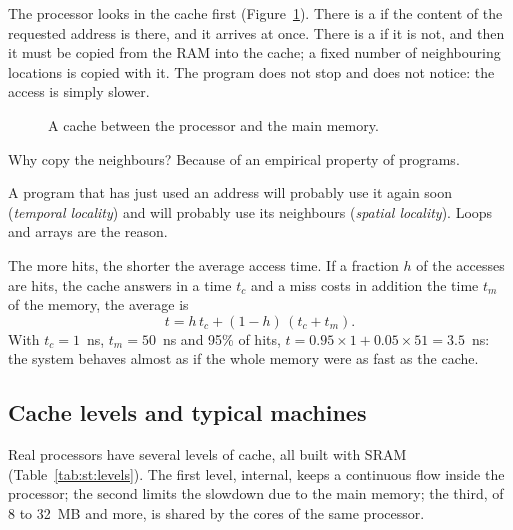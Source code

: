 The processor looks in the cache first (Figure~\ref{fig:st:cache}). There is
a  if the content of the requested address is there, and it arrives
at once. There is a  if it is not, and then it must be copied from
the RAM into the cache; a fixed number of neighbouring locations is copied
with it. The program does not stop and does not notice: the access is simply
slower.

\begin{figure}[htb]
\centering
{}
\caption{A cache between the processor and the main memory.}
\label{fig:st:cache}
\end{figure}

Why copy the neighbours? Because of an empirical property of programs.

\begin{prgconcept}
A program that has just used an address will probably use it again soon
(\emph{temporal locality}) and will probably use its neighbours
(\emph{spatial locality}). Loops and arrays are the reason.
\end{prgconcept}

The more hits, the shorter the average access time. If a fraction $h$ of the
accesses are hits, the cache answers in a time $t_c$ and a miss costs in
addition the time $t_m$ of the memory, the average is
\[ t = h\,t_c+(1-h)\,(t_c+t_m). \]
With $t_c=1$~ns, $t_m=50$~ns and 95\% of hits,
$t=0.95\times 1+0.05\times 51=3.5$~ns: the system behaves almost as if the
whole memory were as fast as the cache.

\subsection{Cache levels and typical machines}

Real processors have several levels of cache, all built with SRAM
(Table~\ref{tab:st:levels}). The first level, internal, keeps a continuous
flow inside the processor; the second limits the slowdown due to the main
memory; the third, of 8 to 32~MB and more, is shared by the cores of the same
processor.

